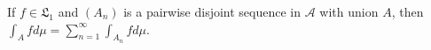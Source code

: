 If $f \in \mathfrak{L}_1$ and $(A_n)$ is a pairwise disjoint sequence in $\mathcal{A}$ with union $A$, then $\int_A f d\mu = \sum_{n=1}^{\infty} \int_{A_n} f d\mu$.
